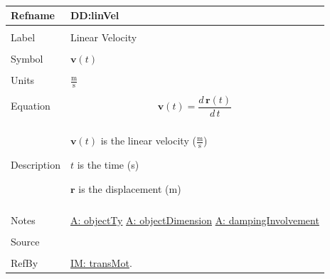 \documentclass[12pt]{article}
\begin{document}
~\newline
 \noindent \begin{minipage}{\textwidth}
\begin{tabular}{p{} p{}}
\toprule \textbf{Refname} & \textbf{DD:linVel}
\label{DD:linVel}
\\ \midrule \\
Label & Linear Velocity
        \\ \midrule \\
        Symbol & $\mathbf{v}(t)$
                 \\ \midrule \\
                 Units & $\frac{\text{m}}{\text{s}}$
                         \\ \midrule \\
                         Equation & \begin{displaymath}
                                    \mathbf{v}(t)=\frac{d\,\mathbf{r}\left(t\right)}{d\,t}
                                    \end{displaymath}
                                    \\ \midrule \\
                                    Description & \begin{symbDescription}
                                                  \item{$\mathbf{v}(t)$ is the linear velocity ($\frac{\text{m}}{\text{s}}$)}
                                                  \item{$t$ is the time (s)}
                                                  \item{$\mathbf{r}$ is the displacement (m)}
                                                  \end{symbDescription}
                                                  \\ \midrule \\
                                                  Notes & \hyperref[A:objectTy]{A: objectTy}
                                                          \hyperref[A:objectDimension]{A: objectDimension}
                                                          \hyperref[A:dampingInvolvement]{A: dampingInvolvement}
                                                          \\ \midrule \\
                                                          Source & \\ \midrule \\
                                                                   RefBy & \hyperref[IM:transMot]{IM: transMot}.
\\ \bottomrule \end{tabular}
\end{minipage}\\
\end{document}
